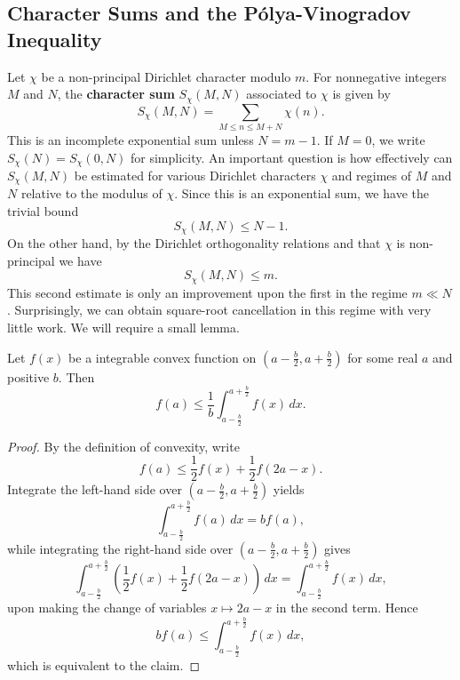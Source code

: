 \documentclass[12pt]{article}
\begin{document}
    \subsection{Character Sums and the P\'olya-Vinogradov Inequality}
      Let \(\chi\) be a non-principal Dirichlet character modulo \(m\). For nonnegative integers \(M\) and \(N\), the \textbf{character sum} \(S_{\chi}(M,N)\) associated to \(\chi\) is given by
      \[
        S_{\chi}(M,N) = \sum_{M \le n \le M+N}\chi(n).
      \]
      This is an incomplete exponential sum unless \(N = m-1\). If \(M = 0\), we write \(S_{\chi}(N) = S_{\chi}(0,N)\) for simplicity. An important question is how effectively can \(S_{\chi}(M,N)\) be estimated for various Dirichlet characters \(\chi\) and regimes of \(M\) and \(N\) relative to the modulus of \(\chi\). Since this is an exponential sum, we have the trivial bound
      \[
        S_{\chi}(M,N) \le N-1.
      \]
      On the other hand, by the Dirichlet orthogonality relations and that \(\chi\) is non-principal we have
      \[
        S_{\chi}(M,N) \le m.
      \]
      This second estimate is only an improvement upon the first in the regime \(m \ll N\). Surprisingly, we can obtain square-root cancellation in this regime with very little work. We will require a small lemma.

      \begin{lemma}\label{lem:Polya-Vinogradov_lemma}
        Let \(f(x)\) be a integrable convex function on \(\left(a-\frac{b}{2},a+\frac{b}{2}\right)\) for some real \(a\) and positive \(b\). Then
        \[
          f(a) \le \frac{1}{b}\int_{a-\frac{b}{2}}^{a+\frac{b}{2}}f(x)\,dx.
        \]
      \end{lemma}
      \begin{proof}
        By the definition of convexity, write
        \[
          f(a) \le \frac{1}{2}f(x)+\frac{1}{2}f(2a-x).
        \]
        Integrate the left-hand side over \(\left(a-\frac{b}{2},a+\frac{b}{2}\right)\) yields
        \[
          \int_{a-\frac{b}{2}}^{a+\frac{b}{2}}f(a)\,dx = bf(a),
        \]
        while integrating the right-hand side over \(\left(a-\frac{b}{2},a+\frac{b}{2}\right)\) gives
        \[
          \int_{a-\frac{b}{2}}^{a+\frac{b}{2}}\left(\frac{1}{2}f(x)+\frac{1}{2}f(2a-x)\right)\,dx = \int_{a-\frac{b}{2}}^{a+\frac{b}{2}}f(x)\,dx,
        \]
        upon making the change of variables \(x \mapsto 2a-x\) in the second term. Hence
        \[
          bf(a) \le \int_{a-\frac{b}{2}}^{a+\frac{b}{2}}f(x)\,dx,
        \]
        which is equivalent to the claim.
      \end{proof}
      
\end{document}
